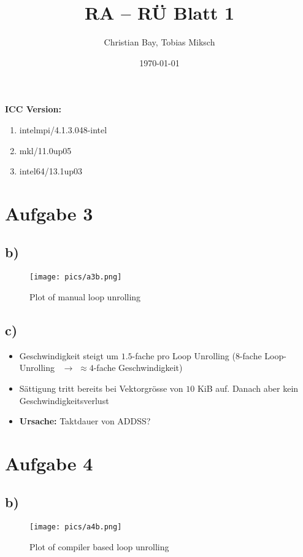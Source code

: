 \documentclass{article}
\title{RA -- R\"U Blatt 1}
\author{Christian Bay, Tobias Miksch}
\date{\today}
\begin{document}
\maketitle

\textbf{ICC Version:}
\begin{enumerate}
	\item intelmpi/4.1.3.048-intel
	\item mkl/11.0up05
	\item intel64/13.1up03
\end{enumerate}

\vspace*{6pt}

\section*{Aufgabe 3}
\subsection*{b)}

\begin{center}
	\begin{figure}[h]
	\texttt{[image: pics/a3b.png]}
	\caption{Plot of manual loop unrolling}
	\end{figure}
\end{center}

\subsection*{c)}
\begin{itemize}
	\item Geschwindigkeit steigt um $1.5$-fache pro Loop Unrolling ($8$-fache Loop-Unrolling \
		$\rightarrow$ $\approx4$-fache Geschwindigkeit)
	\item Sättigung tritt bereits bei Vektorgr\"osse von $10$ KiB auf. Danach aber kein
		Geschwindigkeitsverlust
	\item \textbf{Ursache:} Taktdauer von ADDSS?
\end{itemize}

\section*{Aufgabe 4}
\subsection*{b)}

\begin{center}
	\begin{figure}[h]
	\texttt{[image: pics/a4b.png]}
	\caption{Plot of compiler based loop unrolling}
	\end{figure}
\end{center}
\end{document}
